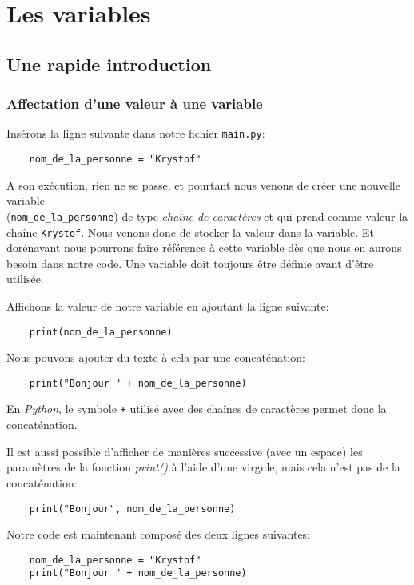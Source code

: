 \chapter{Les variables}
\section{Une rapide introduction}
\subsection*{Affectation d'une valeur à une variable}
Insérons la ligne suivante dans notre fichier \texttt{main.py}:
\begin{verbatim}
    nom_de_la_personne = "Krystof"
\end{verbatim}
\medskip

A son exécution, rien ne se passe, et pourtant nous venons de créer une nouvelle variable \\(\texttt{nom\_de\_la\_personne}) de type \textit{chaîne de caractères} et qui prend comme valeur la chaîne \texttt{Krystof}. Nous venons donc de stocker la valeur dans la variable. Et dorénavant nous pourrons faire référence à cette variable dès que nous en aurons besoin dans notre code. Une variable doit toujours être définie avant d'être utilisée.
\medskip

Affichons la valeur de notre variable en ajoutant la ligne suivante:
\begin{verbatim}
    print(nom_de_la_personne)
\end{verbatim}
\medskip

Nous pouvons ajouter du texte à cela par une concaténation:
\begin{verbatim}
    print("Bonjour " + nom_de_la_personne)
\end{verbatim}
En \textit{Python}, le symbole \texttt{+} utilisé avec des chaînes de caractères permet donc la concaténation.
\medskip

Il est aussi possible d'afficher de manières successive (avec un espace) les paramètres de la fonction \textit{print()} à l'aide d'une virgule, mais cela n'est pas de la concaténation:
\begin{verbatim}
    print("Bonjour", nom_de_la_personne)
\end{verbatim}
\medskip

Notre code est maintenant composé des deux lignes suivantes:
\begin{lstlisting}
	nom_de_la_personne = "Krystof"
	print("Bonjour " + nom_de_la_personne)
\end{lstlisting}
\medskip

